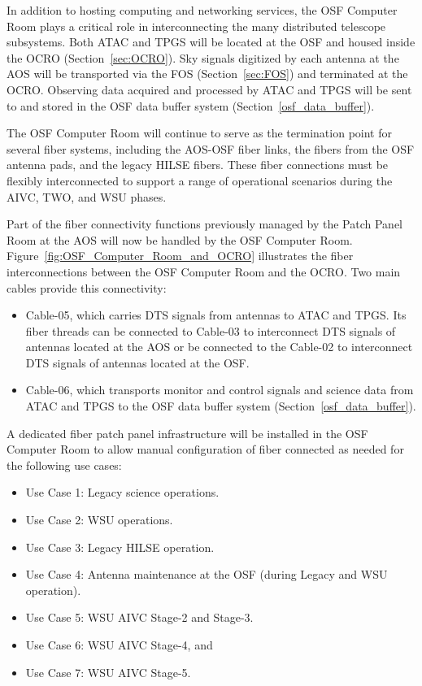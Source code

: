 In addition to hosting computing and networking services, the OSF Computer Room plays a critical role in interconnecting the many distributed telescope subsystems. Both  \ac{ATAC} and \ac{TPGS}  will be located at the \ac{OSF} and housed inside the \ac{OCRO} (Section~\ref{sec:OCRO}). Sky signals digitized by each antenna at the \ac{AOS} will be transported via the \ac{FOS} (Section~\ref{sec:FOS}) and terminated at the \ac{OCRO}. Observing data acquired and processed by ATAC and TPGS will be sent to and stored in the OSF data buffer system (Section~\ref{osf_data_buffer}).

The OSF Computer Room will continue to serve as the termination point for several fiber systems, including the AOS-OSF fiber links, the fibers from the OSF antenna pads, and the legacy \ac{HILSE} fibers. These fiber connections must be flexibly interconnected to support a range of operational scenarios during the AIVC, TWO, and WSU phases.

Part of the fiber connectivity functions previously managed by the Patch Panel Room at the \ac{AOS} will now be handled by the OSF Computer Room. Figure~\ref{fig:OSF_Computer_Room_and_OCRO} illustrates the fiber interconnections between the OSF Computer Room and the OCRO. Two main cables provide this connectivity:
\begin{itemize}[itemsep=-0.5em]
    \item Cable-05, which carries DTS signals from antennas to ATAC and TPGS. Its fiber threads can be connected to Cable-03 to interconnect DTS signals of antennas located at the AOS or be connected to the Cable-02 to interconnect DTS signals of antennas located at the OSF.
    \item Cable-06, which transports monitor and control signals and science data from ATAC and TPGS to the OSF data buffer system (Section~\ref{osf_data_buffer}).
\end{itemize}

A dedicated fiber patch panel infrastructure will be installed in the OSF Computer Room to allow manual configuration of fiber connected as needed for the following use cases:


\begin{itemize} [itemsep=-0.5em]
    \item Use Case 1: Legacy science operations.
    \item Use Case 2: WSU operations.
    \item Use Case 3: Legacy \ac{HILSE} operation.
    \item Use Case 4: Antenna maintenance at the OSF (during Legacy and WSU operation).
    \item Use Case 5: WSU AIVC Stage-2 and Stage-3. 
    \item Use Case 6: WSU AIVC Stage-4, and
    \item Use Case 7: WSU AIVC Stage-5. 
\end{itemize}


